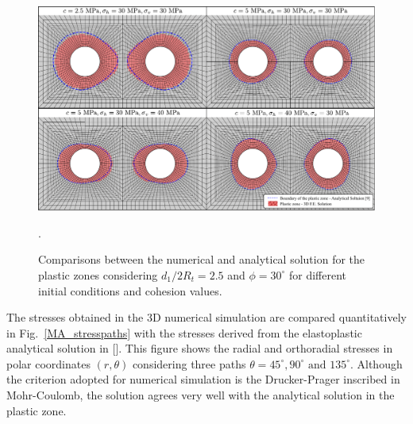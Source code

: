 \documentclass[a4paper,fleqn]{cas-sc}
\begin{document}
\begin{figure}[h!]
	\centering
	\includegraphics[scale=0.7]{MA_Comparisions_plastic_zones.pdf}
	\caption{Comparisons between the numerical and analytical solution for the plastic zones considering $d_1/2R_t = 2.5$ and $\phi = 30^\circ$ for different initial conditions and cohesion values.}.
	\label{MA_FIG1}
\end{figure}
\FloatBarrier

The stresses obtained in the 3D numerical simulation are compared quantitatively in Fig.~\ref{MA_stresspaths} with the stresses derived from the elastoplastic analytical solution in []. This figure shows the radial and orthoradial stresses in polar coordinates $(r,\theta)$ considering three paths $\theta = 45^\circ, 90^\circ \text{~and~} 135^\circ$. Although the criterion adopted for numerical simulation is the Drucker-Prager inscribed in Mohr-Coulomb, the solution agrees very well with the analytical solution in the plastic zone.
\end{document}

